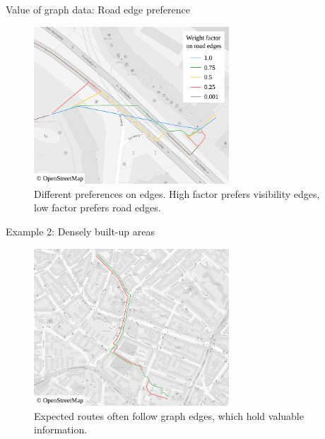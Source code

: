 \documentclass[xcolor={x11names}]{beamer}
\newenvironment{figcenter}
{%
	\parskip=0pt%
	\par%
	\nopagebreak%
	\centering%
}%
{%
	\par%
	\noindent%
	\ignorespacesafterend%
}
\begin{document}
	\begin{frame}{Value of graph data: Road edge preference}
		\begin{figure}[t]
			\begin{figcenter}
				\includegraphics[width=0.65\textwidth]{images/qgis-routing-city-weights.pdf}
			\end{figcenter}
			\caption{Different preferences on edges. High factor prefers visibility edges, low factor prefers road edges.}
		\end{figure}
	\end{frame}
	
	\begin{frame}{Example 2: Densely built-up areas}
		\begin{figure}[t]
			\begin{figcenter}
				\includegraphics[width=0.65\textwidth]{images/qgis-routing-similar.pdf}
			\end{figcenter}
			\caption{Expected routes often follow graph edges, which hold valuable information.}
		\end{figure}
	\end{frame}
	
\end{document}
